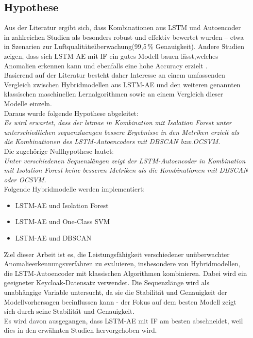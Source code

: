 \documentclass[a4paper,12pt]{article}
\begin{document}
	\subsection{Hypothese}
	Aus der Literatur ergibt sich, dass Kombinationen aus LSTM und Autoencoder in zahlreichen Studien als besonders robust und effektiv bewertet wurden – etwa in Szenarien zur Luftqualitätsüberwachung(99{,}5\,\% Genauigkeit)\cite{wei2023lstm}.
	Andere Studien zeigen, dass sich LSTM-AE mit IF ein gutes Modell bauen lässt,welches Anomalien erkennen kann und ebenfalls eine hohe Accuracy erzielt \cite{tran2020lstm_if}.
	\\[0.5em]
	Basierend auf der Literatur besteht daher Interesse an einem umfassenden Vergleich zwischen Hybridmodellen aus LSTM-AE und den weiteren genannten klassischen maschinellen Lernalgorithmen sowie an einem Vergleich dieser Modelle einzeln.
	\\[0.5em]
	Daraus wurde folgende Hypothese abgeleitet:
	\\[0.5em]
	\textit{Es wird erwartet, dass der \gls{lstmae} in Kombination mit Isolation Forest unter unterschiedlichen \gls{sequenzlaenge}n bessere Ergebnisse in den Metriken erzielt als die Kombinationen des LSTM-Autoencoders mit DBSCAN bzw.OCSVM.}
	\\[0.5em]
	Die zugehörige Nullhypothese lautet:
	\\[0.5em]
	\textit{Unter verschiedenen Sequenzlängen zeigt der LSTM-Autoencoder in Kombination mit Isolation Forest keine besseren Metriken als die Kombinationen mit DBSCAN oder OCSVM.}
	\\[0.5em]
	Folgende Hybridmodelle werden implementiert:
	\begin{itemize}
		\item LSTM-AE und Isolation Forest
		\item LSTM-AE und One-Class SVM
		\item LSTM-AE und DBSCAN
	\end{itemize}
	Ziel dieser Arbeit ist es, die Leistungsfähigkeit verschiedener unüberwachter Anomalieerkennungsverfahren zu evaluieren, insbesondere von Hybridmodellen, die LSTM-Autoencoder mit klassischen Algorithmen kombinieren. Dabei wird ein geeigneter Keycloak-Datensatz verwendet. Die Sequenzlänge wird als unabhängige Variable untersucht, da sie die Stabilität und Genauigkeit der Modellvorhersagen beeinflussen kann - der Fokus auf dem besten Modell zeigt sich durch seine Stabilität und Genauigkeit.
	\\[0.5em]
	Es wird davon ausgegangen, dass LSTM-AE mit IF am besten abschneidet, weil dies in den erwähnten Studien hervorgehoben wird.
\end{document}
